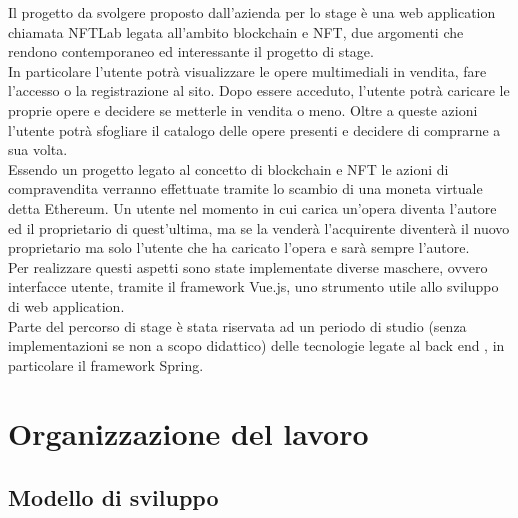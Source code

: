 Il progetto da svolgere proposto dall'azienda per lo stage è una web application chiamata NFTLab legata all'ambito blockchain e NFT, due argomenti che rendono contemporaneo ed interessante il progetto di stage.\\
In particolare l'utente potrà visualizzare le opere multimediali in vendita, fare l'accesso o la registrazione al sito. Dopo essere acceduto, l'utente potrà caricare le proprie opere e decidere se metterle in vendita o meno. Oltre a queste azioni l'utente potrà sfogliare il catalogo delle opere presenti e decidere di comprarne a sua volta.\\
Essendo un progetto legato al concetto di blockchain e NFT le azioni di compravendita verranno effettuate tramite lo scambio di una moneta virtuale detta Ethereum. Un utente nel momento in cui carica un'opera diventa l'autore ed il proprietario di quest'ultima, ma se la venderà l'acquirente diventerà il nuovo proprietario ma solo l'utente che ha caricato l'opera e sarà sempre l'autore.\\
Per realizzare questi aspetti sono state implementate diverse maschere, ovvero interfacce utente, tramite il framework Vue.js, uno strumento utile allo sviluppo di web application.\\
Parte del percorso di stage è stata riservata ad un periodo di studio (senza implementazioni se non a scopo didattico) delle tecnologie legate al back end , in particolare il framework Spring.

\section{Organizzazione del lavoro}

\subsection{Modello di sviluppo}

